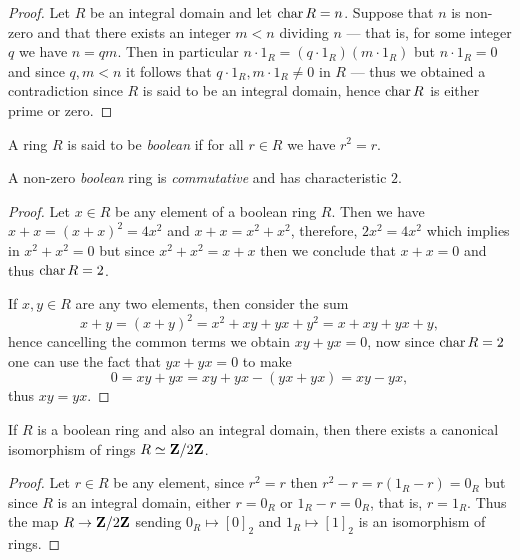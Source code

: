 \begin{proof}
    Let \(R\) be an integral domain and let \(\operatorname{char} R = n\). Suppose that \(n\) is
    non-zero and that there exists an integer \(m < n\) dividing \(n\) --- that is,
    for some integer \(q\) we have \(n = q m\). Then in particular
    \(n \cdot 1_R = (q \cdot 1_R) (m \cdot 1_R)\) but \(n \cdot 1_R = 0\) and since
    \(q, m < n\) it follows that \(q \cdot 1_R, m \cdot 1_R \neq 0\) in \(R\) ---
    thus we obtained a contradiction since \(R\) is said to be an integral domain,
    hence \(\operatorname{char} R\) is either prime or zero.
\end{proof}

\begin{definition}
    \label{def:boolean-ring}
    A ring \(R\) is said to be \emph{boolean} if for all \(r \in R\) we have
    \(r^2 = r\).
\end{definition}

\begin{corollary}
    \label{cor:boolean-is-commutative-and-char-2}
    A non-zero \emph{boolean} ring is \emph{commutative} and has characteristic
    \(2\).
\end{corollary}

\begin{proof}
    Let \(x \in R\) be any element of a boolean ring \(R\). Then we have
    \(x + x = (x + x)^2 = 4 x^2\) and \(x + x = x^2 + x^2\), therefore,
    \(2 x^2 = 4 x^2\) which implies in \(x^2 + x^2 = 0\) but since
    \(x^2 + x^2 = x + x\) then we conclude that \(x + x = 0\) and thus
    \(\operatorname{char} R = 2\).

    If \(x, y \in R\) are any two elements, then consider the sum
    \[
        x + y
        = (x + y)^2
        = x^2 + x y + y x + y^2
        = x + x y + y x + y,
    \]
    hence cancelling the common terms we obtain \(x y + y x = 0\), now since
    \(\operatorname{char} R = 2\) one can use the fact that \(y x + yx = 0\) to make
    \[
        0 = x y + y x = x y + y x - (y x + y x) = x y - y x,
    \]
    thus \(x y = y x\).
\end{proof}

\begin{corollary}
    \label{cor:boolean-integral-domain-is-Z/2Z}
    If \(R\) is a boolean ring and also an integral domain, then there exists a
    canonical isomorphism of rings \(R \simeq \mathbf{Z}/2\mathbf{Z}\).
\end{corollary}

\begin{proof}
    Let \(r \in R\) be any element, since \(r^2 = r\) then
    \(r^2 - r = r(1_R - r) = 0_R\) but since \(R\) is an integral domain, either
    \(r = 0_R\) or \(1_R - r = 0_R\), that is, \(r = 1_R\). Thus the map
    \(R \to \mathbf{Z}/2\mathbf{Z}\) sending \(0_R \mapsto [0]_2\) and \(1_R \mapsto [1]_2\) is an
    isomorphism of rings.
\end{proof}

